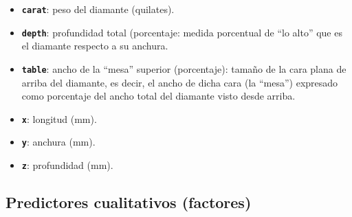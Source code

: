 \documentclass[
  spanish,
]{article}
\providecommand{\tightlist}{%
  \setlength{\itemsep}{0pt}\setlength{\parskip}{0pt}}
\begin{document}
\begin{itemize}
\tightlist
\item
  \textbf{\texttt{carat}}: peso del diamante (quilates).
\item
  \textbf{\texttt{depth}}: profundidad total (porcentaje: medida
  porcentual de ``lo alto'' que es el diamante respecto a su anchura.
\item
  \textbf{\texttt{table}}: ancho de la ``mesa'' superior (porcentaje):
  tamaño de la cara plana de arriba del diamante, es decir, el ancho de
  dicha cara (la ``mesa'') expresado como porcentaje del ancho total del
  diamante visto desde arriba.
\item
  \textbf{\texttt{x}}: longitud (mm).
\item
  \textbf{\texttt{y}}: anchura (mm).
\item
  \textbf{\texttt{z}}: profundidad (mm).
\end{itemize}

\subsection{Predictores cualitativos
(factores)}\label{predictores-cualitativos-factores}
\end{document}
